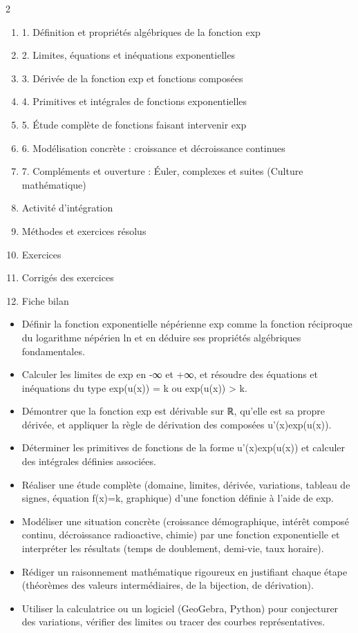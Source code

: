 \documentclass[11pt]{article}
\begin{document}
\begin{sommaire}
\begin{multicols}{2}
\begin{enumerate}
\item 1. Définition et propriétés algébriques de la fonction exp
\item 2. Limites, équations et inéquations exponentielles
\item 3. Dérivée de la fonction exp et fonctions composées
\item 4. Primitives et intégrales de fonctions exponentielles
\item 5. Étude complète de fonctions faisant intervenir exp
\item 6. Modélisation concrète : croissance et décroissance continues
\item 7. Compléments et ouverture : Éuler, complexes et suites (Culture mathématique)
\item Activité d'intégration
\item Méthodes et exercices résolus
\item Exercices
\item Corrigés des exercices
\item Fiche bilan
\end{enumerate}
\end{multicols}
\end{sommaire}

\begin{objectifs}
\begin{itemize}
\item Définir la fonction exponentielle népérienne exp comme la fonction réciproque du logarithme népérien ln et en déduire ses propriétés algébriques fondamentales.
\item Calculer les limites de exp en -∞ et +∞, et résoudre des équations et inéquations du type exp(u(x)) = k ou exp(u(x)) > k.
\item Démontrer que la fonction exp est dérivable sur ℝ, qu'elle est sa propre dérivée, et appliquer la règle de dérivation des composées u'(x)exp(u(x)).
\item Déterminer les primitives de fonctions de la forme u'(x)exp(u(x)) et calculer des intégrales définies associées.
\item Réaliser une étude complète (domaine, limites, dérivée, variations, tableau de signes, équation f(x)=k, graphique) d'une fonction définie à l'aide de exp.
\item Modéliser une situation concrète (croissance démographique, intérêt composé continu, décroissance radioactive, chimie) par une fonction exponentielle et interpréter les résultats (temps de doublement, demi-vie, taux horaire).
\item Rédiger un raisonnement mathématique rigoureux en justifiant chaque étape (théorèmes des valeurs intermédiaires, de la bijection, de dérivation).
\item Utiliser la calculatrice ou un logiciel (GeoGebra, Python) pour conjecturer des variations, vérifier des limites ou tracer des courbes représentatives.
\end{itemize}
\end{objectifs}
\end{document}
